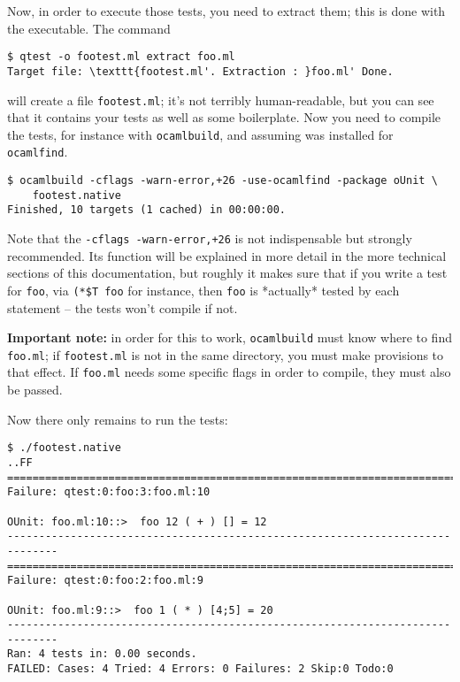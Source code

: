 \documentclass[a4paper,12pt]{article}
\begin{document}
Now, in order to execute those tests, you need to extract them; this is done with the
\qtest{} executable. The command

\Oconsole
\begin{verbatim}
$ qtest -o footest.ml extract foo.ml
Target file: \texttt{footest.ml'. Extraction : }foo.ml' Done.
\end{verbatim} 

will create a file \texttt{footest.ml}; it's not terribly human-readable, but you can see that it
contains your tests as well as some \ounit{} boilerplate. Now you need to compile the
tests, for instance with \texttt{ocamlbuild}, and assuming \ounit{} was installed for \texttt{ocamlfind}.
    
\begin{verbatim}
$ ocamlbuild -cflags -warn-error,+26 -use-ocamlfind -package oUnit \
    footest.native
Finished, 10 targets (1 cached) in 00:00:00.
\end{verbatim}

Note that the \texttt{-cflags -warn-error,+26} is not indispensable but strongly recommended. Its
function will be explained in more detail in the more technical sections of this
documentation, but roughly it makes sure that if you write a test for \texttt{foo}, via
\texttt{(*\$T foo} for instance, then \texttt{foo} is *actually* tested by each statement
-- the tests won't compile if not.

\textbf{Important note:} in order for this to work, \texttt{ocamlbuild} must know where to find
\texttt{foo.ml}; if \texttt{footest.ml} is not in the same directory, you must make provisions to that
effect. If \texttt{foo.ml} needs some specific flags in order to compile, they must also be
passed.


Now there only remains to run the tests:

\begin{verbatim}
$ ./footest.native
..FF
==============================================================================
Failure: qtest:0:foo:3:foo.ml:10

OUnit: foo.ml:10::>  foo 12 ( + ) [] = 12
------------------------------------------------------------------------------
==============================================================================
Failure: qtest:0:foo:2:foo.ml:9

OUnit: foo.ml:9::>  foo 1 ( * ) [4;5] = 20
------------------------------------------------------------------------------
Ran: 4 tests in: 0.00 seconds.
FAILED: Cases: 4 Tried: 4 Errors: 0 Failures: 2 Skip:0 Todo:0
\end{verbatim} 
\end{document}
